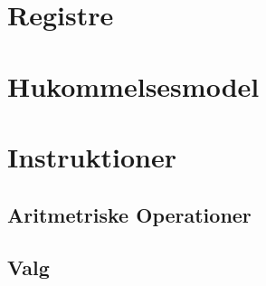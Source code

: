\section{Registre}

\section{Hukommelsesmodel}

\section{Instruktioner}

\subsection{Aritmetriske Operationer}

\subsection{Valg}



